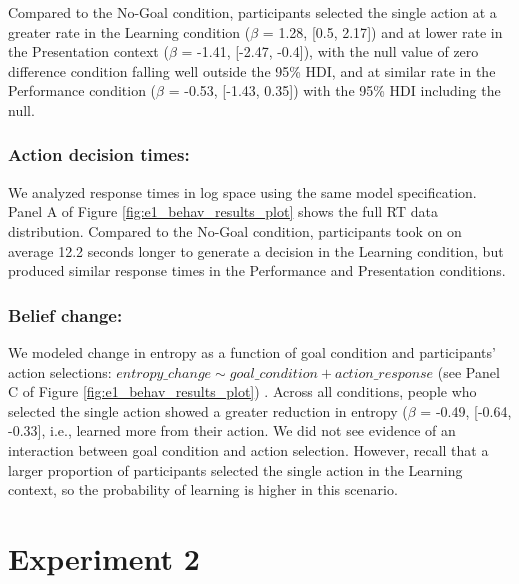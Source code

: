 \documentclass[10pt, letterpaper]{article}
\begin{document}
Compared to the No-Goal condition, participants selected the single
action at a greater rate in the Learning condition (\(\beta\) = 1.28,
{[}0.5, 2.17{]}) and at lower rate in the Presentation context
(\(\beta\) = -1.41, {[}-2.47, -0.4{]}), with the null value of zero
difference condition falling well outside the 95\% HDI, and at similar
rate in the Performance condition (\(\beta\) = -0.53, {[}-1.43, 0.35{]})
with the 95\% HDI including the null.

\subsubsection{Action decision times:}\label{action-decision-times}

We analyzed response times in log space using the same model
specification. Panel A of Figure \ref{fig:e1_behav_results_plot} shows
the full RT data distribution. Compared to the No-Goal condition,
participants took on on average 12.2 seconds longer to generate a
decision in the Learning condition, but produced similar response times
in the Performance and Presentation conditions.

\subsubsection{Belief change:}\label{belief-change}

We modeled change in entropy as a function of goal condition and
participants' action selections:
\texttt{$entropy\_change \sim goal\_condition + action\_response$} (see
Panel C of Figure \ref{fig:e1_behav_results_plot}) . Across all
conditions, people who selected the single action showed a greater
reduction in entropy (\(\beta\) = -0.49, {[}-0.64, -0.33{]}, i.e.,
learned more from their action. We did not see evidence of an
interaction between goal condition and action selection. However, recall
that a larger proportion of participants selected the single action in
the Learning context, so the probability of learning is higher in this
scenario.

\section{Experiment 2}\label{experiment-2}
\end{document}
